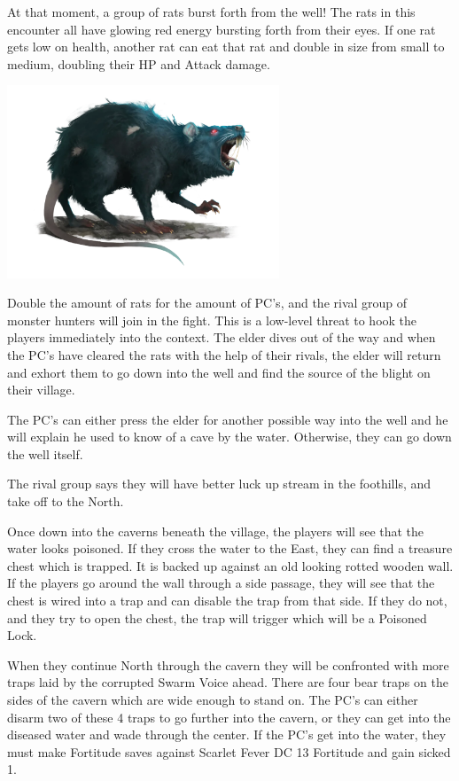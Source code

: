 \begin{multicols}{2}
  At that moment, a group of rats burst forth from the well! The rats in this encounter all have glowing red energy bursting forth from their eyes. If one rat gets low on health, another rat can eat that rat and double in size from small to medium, doubling their HP and Attack damage.

  \begin{minipage}[t]{.48\textwidth}
    \includegraphics[width=3.2in]{book/img/Giant_Rat}
  \end{minipage}

  Double the amount of rats for the amount of PC's, and the rival group of monster hunters will join in the fight. This is a low-level threat to hook the players immediately into the context. The elder dives out of the way and when the PC's have cleared the rats with the help of their rivals, the elder will return and exhort them to go down into the well and find the source of the blight on their village.

  The PC's can either press the elder for another possible way into the well and he will explain he used to know of a cave by the water. Otherwise, they can go down the well itself.

  The rival group says they will have better luck up stream in the foothills, and take off to the North.

  Once down into the caverns beneath the village, the players will see that the water looks poisoned. If they cross the water to the East, they can find a treasure chest which is trapped. It is backed up against an old looking rotted wooden wall. If the players go around the wall through a side passage, they will see that the chest is wired into a trap and can disable the trap from that side. If they do not, and they try to open the chest, the trap will trigger which will be a Poisoned Lock.

  When they continue North through the cavern they will be confronted with more traps laid by the corrupted Swarm Voice ahead. There are four bear traps on the sides of the cavern which are wide enough to stand on. The PC's can either disarm two of these 4 traps to go further into the cavern, or they can get into the diseased water and wade through the center. If the PC's get into the water, they must make Fortitude saves against Scarlet Fever DC 13 Fortitude and gain sicked 1.


\end{multicols}

